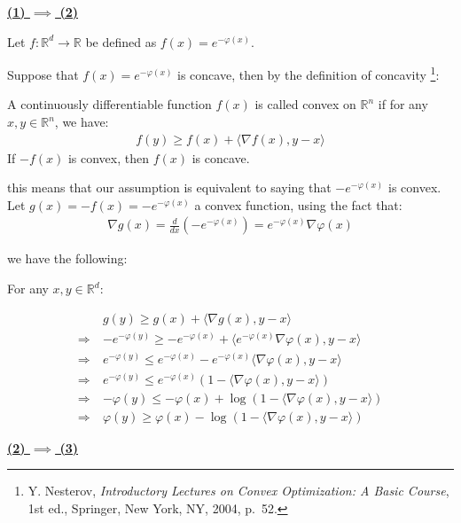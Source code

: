 \documentclass{article}
\begin{document}
\textbf{\underline{(1) $\implies$ (2)}}
\bigskip

Let $f: \mathbb{R}^d \to \mathbb{R}$ be defined as $f(x) = e^{-\varphi(x)}$.
\bigskip

Suppose that $f(x) = e^{-\varphi(x)}$ is concave, then by the definition of concavity
\footnote{Y. Nesterov, \textit{Introductory Lectures on Convex Optimization: A Basic Course}, 1st ed., Springer, New York, NY, 2004, p.~52.}:

\begin{tcolorbox}[bluebox, title = Convex]
    A continuously differentiable function $f(x)$ is called convex on $\mathbb{R}^n$ if for any $x, y \in \mathbb{R}^n$, we have:
    \begin{align*}
        f(y) \geq f(x) + \langle \nabla f(x), y - x \rangle
    \end{align*}
    If $-f(x)$ is convex, then $f(x)$ is concave.
\end{tcolorbox}

this means that our assumption is equivalent to saying that $-e^{-\varphi(x)}$ is convex. 
Let $g(x) = -f(x) = -e^{-\varphi(x)}$ a convex function, 
using the fact that:
\begin{align*}
    \nabla g(x) = \frac{d}{dx} (-e^{-\varphi(x)}) = e^{-\varphi(x)} \nabla \varphi(x)
\end{align*}

we have the following:
\bigskip

For any $x, y \in \mathbb{R}^d$:

\begin{align*}
    &g(y) \geq g(x) + \langle \nabla g(x), y - x \rangle \\
    \Rightarrow \ &-e^{-\varphi(y)} \geq -e^{-\varphi(x)} + \langle e^{-\varphi(x)} \nabla \varphi(x), y - x \rangle \\
    \Rightarrow \ &e^{-\varphi(y)} \leq e^{-\varphi(x)} - e^{-\varphi(x)} \langle \nabla \varphi(x), y - x \rangle \\
    \Rightarrow \ &e^{-\varphi(y)} \leq e^{-\varphi(x)} (1 - \langle \nabla \varphi(x), y - x \rangle) \\
    \Rightarrow \ &- \varphi(y) \leq -\varphi(x) + \log (1 - \langle \nabla \varphi(x), y - x \rangle) \\
    \Rightarrow \ &\varphi(y) \geq \varphi(x) - \log (1 - \langle \nabla \varphi(x), y - x \rangle)
\end{align*}

\textbf{\underline{(2) $\implies$ (3)}}
\bigskip
\end{document}
